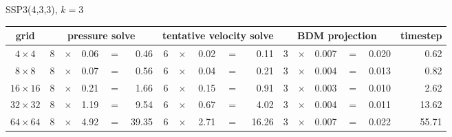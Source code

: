\begin{center}
    SSP3(4,3,3), $k=3$\\[1ex]
    \begin{tabular}{|c|rcrcr|rcrcr|rcrcr|r|}
        \hline
        grid                                           &
        \multicolumn{5}{|c|}{pressure solve}           &
        \multicolumn{5}{|c|}{tentative velocity solve} &
        \multicolumn{5}{|c|}{BDM projection}           &
        timestep                                                                                                                                                            \\
        \hline\hline
        $ 4\times 4$                                   & 8 & $\times$ & 0.06 & $=$ & 0.46  & 6 & $\times$ & 0.02 & $=$ & 0.11  & 3 & $\times$ & 0.007 & $=$ & 0.020 & 0.62  \\
        $ 8\times 8$                                   & 8 & $\times$ & 0.07 & $=$ & 0.56  & 6 & $\times$ & 0.04 & $=$ & 0.21  & 3 & $\times$ & 0.004 & $=$ & 0.013 & 0.82  \\
        $16\times16$                                   & 8 & $\times$ & 0.21 & $=$ & 1.66  & 6 & $\times$ & 0.15 & $=$ & 0.91  & 3 & $\times$ & 0.003 & $=$ & 0.010 & 2.62  \\
        $32\times32$                                   & 8 & $\times$ & 1.19 & $=$ & 9.54  & 6 & $\times$ & 0.67 & $=$ & 4.02  & 3 & $\times$ & 0.004 & $=$ & 0.011 & 13.62 \\
        $64\times64$                                   & 8 & $\times$ & 4.92 & $=$ & 39.35 & 6 & $\times$ & 2.71 & $=$ & 16.26 & 3 & $\times$ & 0.007 & $=$ & 0.022 & 55.71 \\
        \hline\end{tabular}
\end{center}